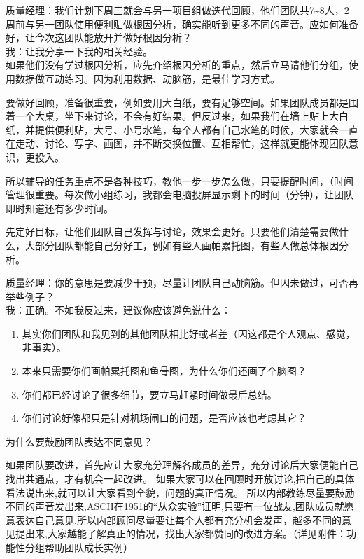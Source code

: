 质量经理：我们计划下周三就会与另一项目组做迭代回顾，他们团队共7\textasciitilde{}8人，2周前与另一团队使用便利贴做根因分析，确实能听到更多不同的声音。应如何准备好，让今次这团队能放开并做好根因分析？\\
我：让我分享一下我的相关经验。\\
如果他们没有学过根因分析，应先介绍根因分析的重点，然后立马请他们分组，使用数据做互动练习。因为利用数据、动脑筋，是最佳学习方式。

要做好回顾，准备很重要，例如要用大白纸，要有足够空间。如果团队成员都是围着一个大桌，坐下来讨论，不会有好结果。但反过来，如果我们在墙上贴上大白纸，并提供便利贴，大号、小号水笔，每个人都有自己水笔的时候，大家就会一直在走动、讨论、写字、画图，并不断交换位置、互相帮忙，这样就更能体现团队意识，更投入。

所以辅导的任务重点不是各种技巧，教他一步一步怎么做，只要提醒时间，（时间管理很重要。每次做小组练习，我都会电脑投屏显示剩下的时间（分钟），让团队即时知道还有多少时间。

先定好目标，让他们团队自己发挥与讨论，效果会更好。只要他们清楚需要做什么，大部分团队都能自己分好工，例如有些人画帕累托图，有些人做总体根因分析。

质量经理：你的意思是要减少干预，尽量让团队自己动脑筋。但因未做过，可否再举些例子？\\
我：正确。不如我反过来，建议你应该避免说什么：

\begin{enumerate}
\tightlist
\item
  其实你们团队和我见到的其他团队相比好或者差（因这都是个人观点、感觉，非事实）。
\item
  本来只需要你们画帕累托图和鱼骨图，为什么你们还画了个脑图？
\item
  你们都已经讨论了很多细节，要立马赶紧时间做最后总结。
\item
  你们讨论好像都只是针对机场闸口的问题，是否应该也考虑其它？
\end{enumerate}

为什么要鼓励团队表达不同意见？

如果团队要改进，首先应让大家充分理解各成员的差异，充分讨论后大家便能自己找出共通点，才有机会一起改进。
如果大家可以在回顾时开放讨论,把自己的具体看法说出来,就可以让大家看到全貌，问题的真正情况。
所以内部教练尽量要鼓励不同的声音发出来,ASCH在1951的``从众实验''证明,只要有一位战友,团队成员就愿意表达自己意见.所以内部顾问尽量要让每个人都有充分机会发声，越多不同的意见提出来,大家越能了解真正的情况，找出大家都赞同的改进方案。（详见附件：功能性分组帮助团队成长实例）

